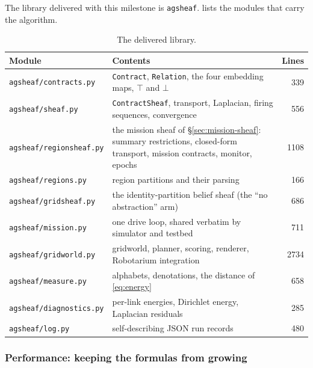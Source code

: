 \documentclass[11pt]{article}
\newif\ifshowcomments
\theoremstyle{definition}
\theoremstyle{remark}
\newcommand{\prompt}[1]{%
    \ifshowcomments
        ~\todo[inline, color=techgold!80, textcolor=black,caption={Task}]{{\bf Prompt:} #1}%
    \fi
}
\begin{document}
\prompt{Optimize the Python code for performance and scalability, ensuring seamless integration
with the Robotarium. Deliverable: Enhanced code, supporting Milestone 4's demonstration.}

The library delivered with this milestone is \texttt{agsheaf}.
 lists the modules that carry the algorithm.

\begin{table}[h]
\centering
\small
\begin{tabular}{@{}llr@{}}
\toprule
\textbf{Module} & \textbf{Contents} & \textbf{Lines} \\
\midrule
\texttt{agsheaf/contracts.py}   & \texttt{Contract}, \texttt{Relation}, the four embedding maps, $\top$ and $\bot$ & 339 \\
\texttt{agsheaf/sheaf.py}       & \texttt{ContractSheaf}, transport, Laplacian, firing sequences, convergence & 556 \\
\texttt{agsheaf/regionsheaf.py} & the mission sheaf of \S\ref{sec:mission-sheaf}: summary restrictions, closed-form transport, mission contracts, monitor, epochs & 1108 \\
\texttt{agsheaf/regions.py}     & region partitions and their parsing & 166 \\
\texttt{agsheaf/gridsheaf.py}   & the identity-partition belief sheaf (the ``no abstraction'' arm) & 686 \\
\texttt{agsheaf/mission.py}     & one drive loop, shared verbatim by simulator and testbed & 711 \\
\texttt{agsheaf/gridworld.py}   & gridworld, planner, scoring, renderer, Robotarium integration & 2734 \\
\texttt{agsheaf/measure.py}     & alphabets, denotations, the distance of \eqref{eq:energy} & 658 \\
\texttt{agsheaf/diagnostics.py} & per-link energies, Dirichlet energy, Laplacian residuals & 285 \\
\texttt{agsheaf/log.py}         & self-describing JSON run records & 480 \\
\bottomrule
\end{tabular}
\caption{The delivered library.}
\label{tab:modules}
\end{table}

\subsubsection{Performance: keeping the formulas from growing}
\end{document}
